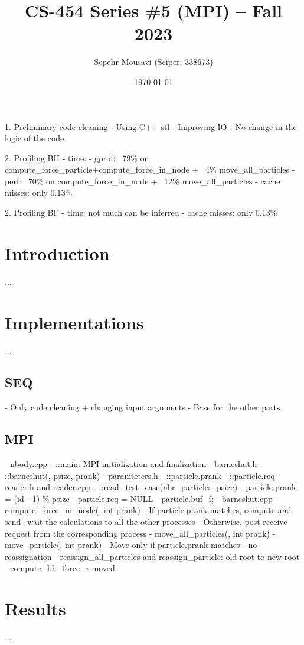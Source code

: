 \documentclass[10pt,journal,compsocconf]{IEEEtran}
\title{CS-454 Series \#5 (MPI) -- Fall 2023}
\author{
  Sepehr Mousavi (Sciper: 338673)
}
\date{\today}
\begin{document}
\maketitle


1. Preliminary code cleaning
  - Using C++ stl
  - Improving IO
  - No change in the logic of the code

2. Profiling BH
  - time:
    - gprof: ~79\% on compute_force_particle+compute_force_in_node + ~4\% move_all_particles
    - perf: ~70\% on compute_force_in_node + ~12\% move_all_particles
  - cache misses: only 0.13\%
    
2. Profiling BF
  - time: not much can be inferred
  - cache misses: only 0.13\%


\section{Introduction}
...

\section{Implementations}
...

\subsection{SEQ}
- Only code cleaning + changing input arguments
- Base for the other parts

\subsection{MPI}
- nbody.cpp
  - ::main: MPI initialization and finalization
- barneshut.h
  - ::barneshut(, psize, prank)
- paramteters.h
  - ::particle.prank
  - ::particle.req
- reader.h and reader.cpp
  - ::read_test_case(nbr_particles, psize)
  - particle.prank = (id - 1) \% psize
  - particle.req = NULL
  - particle.buf_f;
- barneshut.cpp
  - compute_force_in_node(, int prank)
    - If particle.prank matches, compute and send+wait the calculations to all the other processes
    - Otherwise, post receive request from the corresponding process
  - move_all_particles(, int prank)
  - move_particle(, int prank)
      - Move only if particle.prank matches
      - no reassignation
  - reassign_all_particles and reassign_particle: old root to new root
  - compute_bh_force: removed

\section{Results}
...
\end{document}
